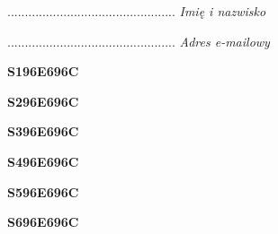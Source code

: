 \begin{turn}{90}\begin{minipage}{\linewidth} \vspace{20mm} ................................................  \textit{Imię i nazwisko}\end{minipage}\end{turn}

\begin{turn}{90}\begin{minipage}{\linewidth} \vspace{20mm} ................................................  \textit{Adres e-mailowy}\end{minipage}\end{turn}

\begin{turn}{90}\huge \begin{minipage}{\linewidth} \vspace{10mm}\textbf{S196E696C}\end{minipage}\end{turn}

\begin{turn}{90}\huge \begin{minipage}{\linewidth} \vspace{10mm}\textbf{S296E696C}\end{minipage}\end{turn}

\begin{turn}{90}\huge \begin{minipage}{\linewidth} \vspace{10mm}\textbf{S396E696C}\end{minipage}\end{turn}

\begin{turn}{90}\huge \begin{minipage}{\linewidth} \vspace{10mm}\textbf{S496E696C}\end{minipage}\end{turn}

\begin{turn}{90}\huge \begin{minipage}{\linewidth} \vspace{10mm}\textbf{S596E696C}\end{minipage}\end{turn}

\begin{turn}{90}\huge \begin{minipage}{\linewidth} \vspace{10mm}\textbf{S696E696C}\end{minipage}\end{turn}

